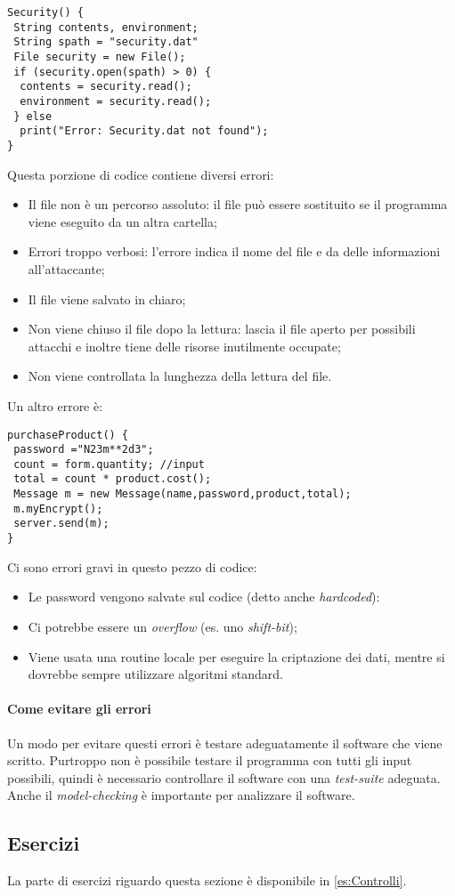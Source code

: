 \begin{verbatim}
Security() {
 String contents, environment;
 String spath = "security.dat"
 File security = new File();
 if (security.open(spath) > 0) {
  contents = security.read();
  environment = security.read();
 } else
  print("Error: Security.dat not found");
}
\end{verbatim}

Questa porzione di codice contiene diversi errori:
\begin{itemize}
\item Il file  non è un percorso assoluto:
il file può essere sostituito se il programma viene eseguito da
un altra cartella;
\item Errori troppo verbosi: l'errore indica il nome del file e da
delle informazioni all'attaccante;
\item Il file viene salvato in chiaro;
\item Non viene chiuso il file dopo la lettura: lascia il file
aperto per possibili attacchi e inoltre tiene delle risorse 
inutilmente occupate;
\item Non viene controllata la lunghezza della lettura del file.
\end{itemize}

Un altro errore è:
\begin{verbatim}
purchaseProduct() {
 password ="N23m**2d3";
 count = form.quantity; //input
 total = count * product.cost();
 Message m = new Message(name,password,product,total);
 m.myEncrypt();
 server.send(m);
}
\end{verbatim}

Ci sono errori gravi in questo pezzo di codice:
\begin{itemize}
\item Le password vengono salvate sul codice (detto anche \textit{hardcoded}):
\item Ci potrebbe essere un \textit{overflow} (es. uno \textit{shift-bit});
\item Viene usata una routine locale per eseguire la criptazione dei dati,
mentre si dovrebbe sempre utilizzare algoritmi standard.
\end{itemize}


\paragraph*{Come evitare gli errori} Un modo per evitare questi errori è
testare adeguatamente il software che viene scritto. Purtroppo non è possibile
testare il programma con tutti gli input possibili, quindi è necessario
controllare il software con una \textit{test-suite} adeguata.
Anche il \textit{model-checking} è importante per analizzare il software.

\subsection{Esercizi}

La parte di esercizi riguardo questa sezione è disponibile in \ref{es:Controlli}.







